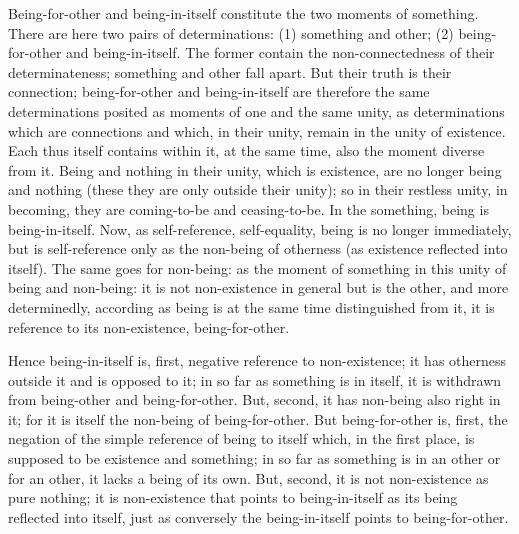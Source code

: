 Being-for-other and being-in-itself constitute
the two moments of something.
There are here two pairs of determinations:
(1) something and other;
(2) being-for-other and being-in-itself.
The former contain the non-connectedness of their determinateness;
something and other fall apart.
But their truth is their connection;
being-for-other and being-in-itself are
therefore the same determinations posited as
moments of one and the same unity,
as determinations which are connections
and which, in their unity,
remain in the unity of existence.
Each thus itself contains within it, at the same time,
also the moment diverse from it.
Being and nothing in their unity, which is existence,
are no longer being and nothing
(these they are only outside their unity);
so in their restless unity, in becoming,
they are coming-to-be and ceasing-to-be.
In the something, being is being-in-itself.
Now, as self-reference, self-equality,
being is no longer immediately,
but is self-reference only as the non-being of otherness
(as existence reflected into itself).
The same goes for non-being:
as the moment of something in this
unity of being and non-being:
it is not non-existence in general
but is the other, and more determinedly,
according as being is at the same time distinguished from it,
it is reference to its non-existence, being-for-other.

Hence being-in-itself is, first, negative reference to non-existence;
it has otherness outside it and is opposed to it;
in so far as something is in itself,
it is withdrawn from being-other and being-for-other.
But, second, it has non-being also right in it;
for it is itself the non-being of being-for-other.
But being-for-other is, first, the negation of
the simple reference of being to itself
which, in the first place, is supposed to be existence and something;
in so far as something is in an other or for an other,
it lacks a being of its own.
But, second, it is not non-existence as pure nothing;
it is non-existence that points to being-in-itself
as its being reflected into itself,
just as conversely the being-in-itself points to being-for-other.

